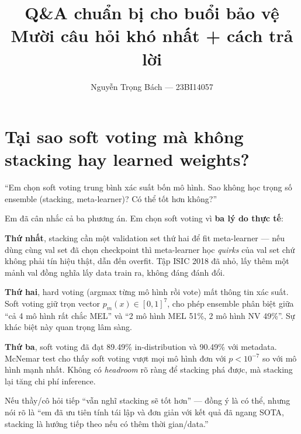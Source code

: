 \documentclass[11pt,a4paper]{article}
\title{
  \vspace{-1.5cm}
  \color{usthblue}\Large\textbf{Q\&A chuẩn bị cho buổi bảo vệ}\\[4pt]
  \color{black!75}\normalsize Mười câu hỏi khó nhất + cách trả lời
}
\author{Nguyễn Trọng Bách --- 23BI14057}
\date{}
\begin{document}
\maketitle
\vspace{-0.8cm}

{\hypersetup{linkcolor=black}\tableofcontents}
\newpage

\section{Tại sao soft voting mà không stacking hay learned weights?}

\begin{question}
``Em chọn soft voting trung bình xác suất bốn mô hình. Sao không học trọng số ensemble (stacking, meta-learner)? Có thể tốt hơn không?''
\end{question}

\begin{answer}
Em đã cân nhắc cả ba phương án. Em chọn soft voting vì \textbf{ba lý do thực tế}:

\textbf{Thứ nhất}, stacking cần một validation set thứ hai để fit meta-learner --- nếu dùng cùng val set đã chọn checkpoint thì meta-learner học \textit{quirks} của val set chứ không phải tín hiệu thật, dẫn đến overfit. Tập ISIC 2018 đã nhỏ, lấy thêm một mảnh val đồng nghĩa lấy data train ra, không đáng đánh đổi.

\textbf{Thứ hai}, hard voting (argmax từng mô hình rồi vote) mất thông tin xác suất. Soft voting giữ trọn vector $p_m(x) \in [0,1]^7$, cho phép ensemble phân biệt giữa ``cả 4 mô hình rất chắc MEL'' và ``2 mô hình MEL 51\%, 2 mô hình NV 49\%''. Sự khác biệt này quan trọng lâm sàng.

\textbf{Thứ ba}, soft voting đã đạt 89.49\% in-distribution và 90.49\% với metadata. McNemar test cho thấy soft voting vượt mọi mô hình đơn với $p < 10^{-7}$ so với mô hình mạnh nhất. Không có \textit{headroom} rõ ràng để stacking phá được, mà stacking lại tăng chi phí inference.
\end{answer}

\begin{tip}
Nếu thầy/cô hỏi tiếp ``vẫn nghĩ stacking sẽ tốt hơn'' --- đồng ý là có thể, nhưng nói rõ là ``em đã ưu tiên tính tái lập và đơn giản với kết quả đã ngang SOTA, stacking là hướng tiếp theo nếu có thêm thời gian/data.''
\end{tip}

\end{document}
